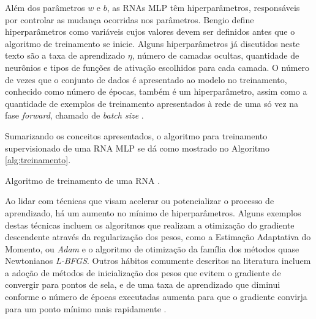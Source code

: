 Além dos parâmetros $w$ e $b$, as RNAs MLP têm hiperparâmetros, responsáveis por controlar as mudança ocorridas nos parâmetros. Bengio define hiperparâmetros como variáveis cujos valores devem ser definidos antes que o algoritmo de treinamento se inicie. Alguns hiperparâmetros já discutidos neste texto são a taxa de aprendizado $\eta$, número de camadas ocultas, quantidade de neurônios e tipos de funções de ativação escolhidos para cada camada. O número de vezes que o conjunto de dados é apresentado ao modelo no treinamento, conhecido como número de épocas, também é um hiperparâmetro, assim como a quantidade de exemplos de treinamento apresentados à rede de uma só vez na fase \emph{forward}, chamado de \emph{batch size} \cite{bengio2012practical}.

Sumarizando os conceitos apresentados, o algoritmo para treinamento supervisionado de uma RNA MLP se dá como mostrado no Algoritmo \ref{alg:treinamento}.

\begin{algorithm}[h!]
	\caption{Algoritmo de treinamento de uma RNA  \cite{Teresa:Livro}.}\label{alg:treinamento}
\end{algorithm}

Ao lidar com técnicas que visam acelerar ou potencializar o processo de aprendizado, há um aumento no mínimo de hiperparâmetros. Alguns exemplos destas técnicas incluem os algoritmos que realizam a otimização do gradiente descendente através da regularização dos pesos, como a Estimação Adaptativa do Momento, ou \emph{Adam} e o algoritmo de otimização da família dos métodos quase Newtonianos \emph{L-BFGS}. Outros hábitos comumente descritos na literatura incluem a adoção de métodos de inicialização dos pesos que evitem o gradiente de convergir para pontos de sela, e de uma taxa de aprendizado que diminui conforme o número de épocas executadas aumenta para que o gradiente convirja para um ponto mínimo mais rapidamente \cite{goodfellow2016deep}.

